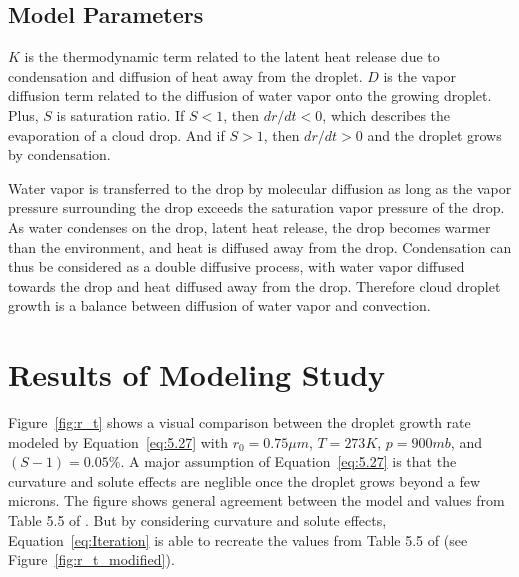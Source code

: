 \documentclass[titlepage]{article}
\begin{document}
\subsection{Model Parameters}
$K$ is the thermodynamic term related to the latent heat release due to
condensation and diffusion of heat away from the droplet.  $D$ is the vapor
diffusion term related to the diffusion of water vapor onto the growing
droplet. Plus, $S$ is saturation ratio. If $S < 1$, then $dr/ dt < 0$, which
describes the evaporation of a cloud drop. And if $S > 1$, then $dr/dt > 0$ and
the droplet grows by condensation.

Water vapor is transferred to the drop by molecular diffusion as long as the
vapor pressure surrounding the drop exceeds the saturation vapor pressure of
the drop. As water condenses on the drop, latent heat release, the drop becomes
warmer than the environment, and heat is diffused away from the drop.
Condensation can thus be considered as a double diffusive process, with water
vapor diffused towards the drop and heat diffused away from the drop. Therefore
cloud droplet growth is a balance between diffusion of water vapor and
convection.



\section{Results of Modeling Study}
Figure~\ref{fig:r_t} shows a visual comparison between the droplet growth rate
modeled by Equation~\eqref{eq:5.27} with $r_0 = 0.75 \mu m$, $T=273 K$, $p=900
mb$, and $(S - 1) = 0.05\%$. A major assumption of Equation~\eqref{eq:5.27} is
that the curvature and solute effects are neglible once the droplet grows
beyond a few microns. The figure shows general agreement between the model and
values from Table 5.5 of \cite{Curry}. But by considering curvature and solute
effects, Equation~\eqref{eq:Iteration} is able to recreate the values from
Table 5.5 of \cite{Curry} (see Figure~\ref{fig:r_t_modified}).
\end{document}
